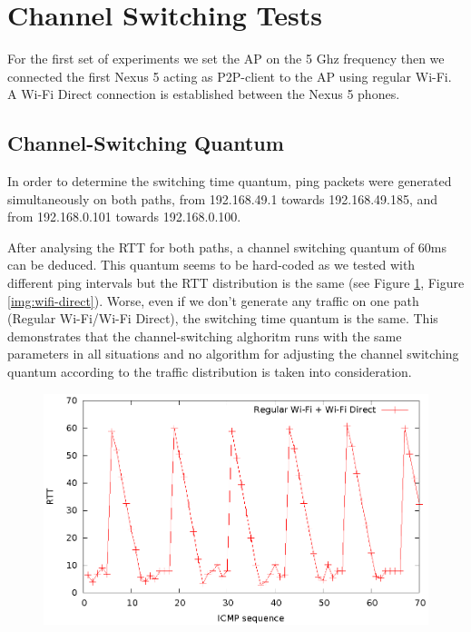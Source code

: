 \section{Channel Switching Tests}
\label{sec:nexus5-chsw}

For the first set of experiments we set the AP on the 5 Ghz frequency then we connected the first Nexus 5 acting as P2P-client to the AP using regular Wi-Fi. A Wi-Fi Direct connection is established between the Nexus 5 phones.
 

\subsection{Channel-Switching Quantum}
\label{sub-sec:chsw-time}

In order to determine the switching time quantum, ping packets were generated simultaneously on both paths, from 192.168.49.1 towards 192.168.49.185, and from 192.168.0.101 towards 192.168.0.100.

After analysing the RTT for both paths, a channel switching quantum of 60ms can be deduced. This quantum seems to be hard-coded as we tested with different ping intervals but the RTT distribution is the same (see Figure \ref{img:regular-wifi}, Figure \ref{img:wifi-direct}). Worse, even if we don't generate any traffic on one path (Regular Wi-Fi/Wi-Fi Direct), the switching time quantum is the same. This demonstrates that the channel-switching alghoritm runs with the same parameters in all situations and no algorithm for adjusting the channel switching quantum according to the traffic distribution is taken into consideration.

\begin{figure}[h!]
\includegraphics{src/img/regularwifi.eps}
\label{img:regular-wifi}
\end{figure}

